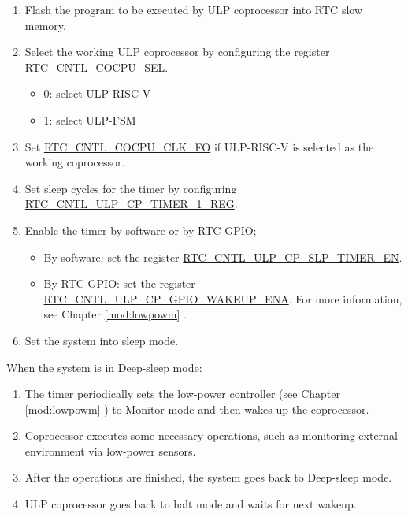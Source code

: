 \documentclass[main\_\_EN.tex]{subfiles}
\begin{document}
\begin{enumerate}
    \item Flash the program to be executed by ULP coprocessor into RTC slow memory.
    \item Select the working ULP coprocessor by configuring the register \hyperref[fielddesc:RTCCNTLCOCPUSEL]{RTC\_CNTL\_COCPU\_SEL}.
    \begin{itemize}
        \item 0: select ULP-RISC-V
        \item 1: select ULP-FSM
    \end{itemize}
    \item Set \hyperref[fielddesc:RTCCNTLCOCPUCLKFO]{RTC\_CNTL\_COCPU\_CLK\_FO} if ULP-RISC-V is selected as the working coprocessor.
    \item Set sleep cycles for the timer by configuring \hyperref[regdesc:RTCCNTLULPCPTIMER1REG]{RTC\_CNTL\_ULP\_CP\_TIMER\_1\_REG}.
    \item Enable the timer by software or by RTC GPIO;
        \begin{itemize}
            \item By software: set the register \hyperref[fielddesc:RTCCNTLULPCPSLPTIMEREN]{RTC\_CNTL\_ULP\_CP\_SLP\_TIMER\_EN}.
        \item By RTC GPIO: set the register \hyperref[fielddesc:RTCCNTLULPCPGPIOWAKEUPENA]{RTC\_CNTL\_ULP\_CP\_GPIO\_WAKEUP\_ENA}. For more information, see Chapter \ref{mod:lowpowm} \textit{}.
        \end{itemize}
    \item Set the system into sleep mode.
\end{enumerate}

When the system is in Deep-sleep mode:

\begin{enumerate}
   \item The timer periodically sets the low-power controller (see Chapter \ref{mod:lowpowm} \textit{}) to Monitor mode and then wakes up the coprocessor.
   \item Coprocessor executes some necessary operations, such as monitoring external environment via low-power sensors.
   \item After the operations are finished, the system goes back to Deep-sleep mode.
   \item ULP coprocessor goes back to halt mode and waits for next wakeup.
\end{enumerate}
\end{document}
